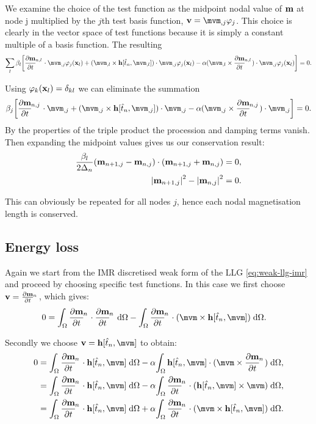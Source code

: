 We examine the choice of the test function as the midpoint nodal value of $\mathbf{m}$ at node j multiplied by the $j$th test basis function, $\testv = \mvm_{,j} \tbf_j$.
This choice is clearly in the vector space of test functions because it is simply a constant multiple of a basis function.
The resulting 
\begin{equation}
  \sum_l \beta_l \bigs{\dmdtml \cdot \mvm_{,j}\tbf_j(\xv_l) + (\mvm_{,l} \times \hv[\tm, \mvm_{,l}]) \cdot \mvm_{,j}\tbf_j(\xv_l) - \dampc (\mvm_{,l} \times \dmdtml) \cdot \mvm_{,j}\tbf_j(\xv_l)} = 0.
\end{equation}

Using $\varphi_k(\mathbf{x}_l) = \delta_{kl}$ we can eliminate the summation
\begin{equation}
  \beta_j \bigs{\dmdtmj \cdot \mvm_{,j} + (\mvm_{,j} \times \hv[\tm, \mvm_{,j}]) \cdot \mvm_{,j} - \dampc (\mvm_{,j} \times \dmdtmj) \cdot \mvm_{,j}} = 0.
\end{equation}
By the properties of the triple product the procession and damping terms vanish. Then expanding the midpoint values gives us our conservation result:
\begin{equation}
  \begin{aligned}
    \frac{\beta_l}{2\Delta_{n}}(\mathbf{m}_{n+1,j} - \mathbf{m}_{n,j}) \cdot (\mathbf{m}_{n+1, j} + \mathbf{m}_{n, j}) &= 0, \\
    \left|{\mathbf{m}_{n+1, j}} \right|^2 - \left|{\mathbf{m}_{n, j}} \right|^2 &= 0.
  \end{aligned}
\end{equation}

This can obviously be repeated for all nodes $j$, hence each nodal magnetisation length is conserved.


\subsection{Energy loss}

Again we start from the IMR discretised weak form of the LLG \eqref{eq:weak-llg-imr} and proceed by choosing specific test functions.
In this case we first choose $\testv = \dmdtm$, which gives:
\begin{equation}
  \label{eq:test-dmdt}
  \begin{aligned}
    0 &= \intd{\dmdtm \cdot \dmdtm} - \intd{\dmdtm  \cdot (\mvm \times \hv[\tm, \mvm])}.
  \end{aligned}
\end{equation}

Secondly we choose $\testv = \hv[\tm, \mvm]$ to obtain:
\begin{equation}
  \label{eq:test-h}
  \begin{aligned}
    0 &= \intd{\dmdtm \cdot \hv[\tm, \mvm]} - \dampc \intd{\hv[\tm, \mvm] \cdot (\mvm \times \dmdtm)}, \\
    & = \intd{\dmdtm \cdot \hv[\tm, \mvm]} - \dampc \intd{\dmdtm \cdot (\hv[\tm, \mvm] \times \mvm)}, \\
    & = \intd{\dmdtm \cdot \hv[\tm, \mvm]} + \dampc \intd{\dmdtm \cdot (\mvm \times \hv[\tm, \mvm])}.
  \end{aligned}
\end{equation}

